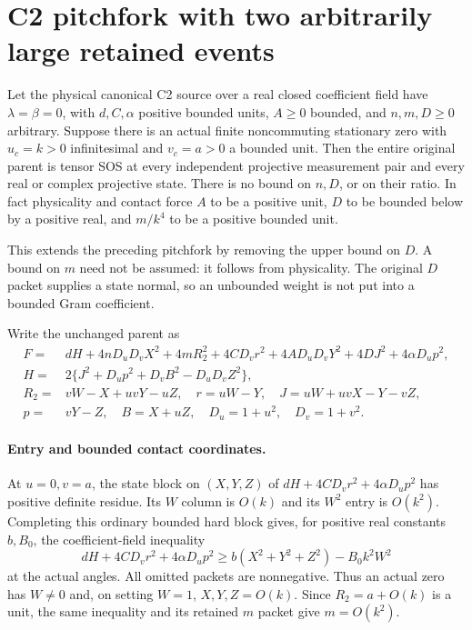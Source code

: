 \section{C2 pitchfork with two arbitrarily large retained events}
\label{sec:c2-two-large}

\begin{theorem}
\label{thm:c2-two-large}
Let the physical canonical C2 source over a real closed coefficient
field have $\lambda=\beta=0$, with $d,C,\alpha$ positive bounded
units, $A\geq0$ bounded, and $n,m,D\geq0$ arbitrary. Suppose there is
an actual finite noncommuting stationary zero with $u_c=k>0$
infinitesimal and $v_c=a>0$ a bounded unit. Then the entire original
parent is tensor SOS at every independent projective measurement
pair and every real or complex projective state.
There is no bound on $n,D$, or on their ratio. In fact physicality and
contact force $A$ to be a positive unit, $D$ to be bounded below by
a positive real, and $m/k^4$ to be a positive bounded unit.
\end{theorem}

This extends the preceding pitchfork by removing the upper bound on
$D$. A bound on $m$ need not be assumed: it follows from physicality.
The original $D$ packet supplies a state normal, so an unbounded
weight is not put into a bounded Gram coefficient.

Write the unchanged parent as
\[
\begin{split}
F={}&dH+4nD_uD_vX^2+4mR_2^2+4CD_vr^2
       +4AD_uD_vY^2+4DJ^2+4\alpha D_up^2,\\
H={}&2\{J^2+D_up^2+D_vB^2-D_uD_vZ^2\},\\
R_2={}&vW-X+uvY-uZ,\quad r=uW-Y,\quad
J=uW+uvX-Y-vZ,\\
p={}&vY-Z,\quad B=X+uZ,\quad D_u=1+u^2,\quad D_v=1+v^2.
\end{split}                                                    \tag{TD1}
\]

\paragraph{Entry and bounded contact coordinates.}
At $u=0,v=a$, the state block on $(X,Y,Z)$ of
$dH+4CD_vr^2+4\alpha D_up^2$ has positive definite residue.
Its $W$ column is $O(k)$ and its $W^2$ entry is $O(k^2)$.
Completing this ordinary bounded hard block gives, for positive
real constants $b,B_0$, the coefficient-field inequality
\[
 dH+4CD_vr^2+4\alpha D_up^2
 \geq b(X^2+Y^2+Z^2)-B_0 k^2W^2
\]
at the actual angles. All omitted packets are nonnegative.
Thus an actual zero has $W\ne0$ and, on setting $W=1$,
$X,Y,Z=O(k)$. Since $R_2=a+O(k)$ is a unit, the same inequality
and its retained $m$ packet give $m=O(k^2)$.


